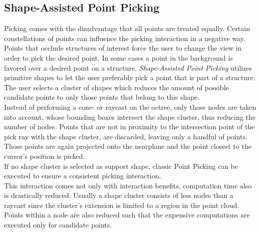 \subsection{Shape-Assisted Point Picking}
Picking comes with the disadvantage that all points are treated equally. Certain constellations of points can influence the picking interaction in a negative way. Points that occlude structures of interest force the user to change the view in order to pick the desired point. In some cases a point in the background is favored over a desired point on a structure. 
 \textit{Shape-Assisted Point Picking} utilizes primitive shapes to let the user preferably pick a point that is part of a structure. The user selects a cluster of shapes which reduces the amount of possible candidate points to only those points that belong to this shape. 
\\
Instead of performing a cone- or raycast on the octree, only those nodes are taken into account, whose bounding boxes intersect the shape cluster, thus reducing the number of nodes. Points that are not in proximity to the intersection point of the pick ray with the shape cluster, are discarded, leaving only a handful of points. Those points are again projected onto the nearplane and the point closest to the cursor's position is picked. 
\\
If no shape cluster is selected as support shape, classic Point Picking can be executed to ensure a consistent picking interaction. 
\\
This interaction comes not only with interaction benefits, computation time also is drastically reduced. Usually a shape cluster consists of less nodes than a raycast since the cluster's extension is limited to a region in the point cloud. Points within a node are also reduced such that the expensive computations are executed only for candidate points. 

